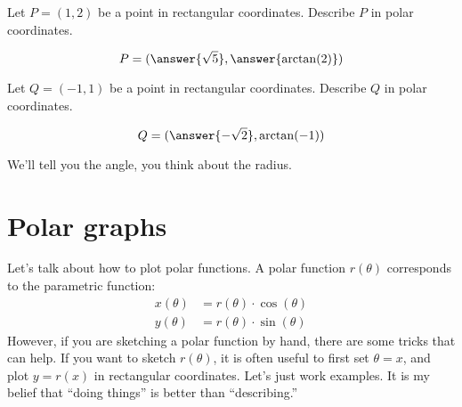 \documentclass{ximera}
\begin{document}
\begin{question}
  Let $P=(1,2)$ be a point in rectangular coordinates. Describe $P$ in
  polar coordinates.
  \begin{prompt}
    \[
    P = (\answer{\sqrt{5}}, \answer{\arctan(2)})
    \]
  \end{prompt}
  \begin{question}
  Let $Q=(-1,1)$ be a point in rectangular coordinates. Describe $Q$ in
  polar coordinates.
  \begin{prompt}
    \[
    Q = (\answer{-\sqrt{2}}, \arctan(-1))
    \]
    \begin{hint}
      We'll tell you the angle, you think about the radius.
    \end{hint}
  \end{prompt}
\end{question}
\end{question}

\section{Polar graphs}

Let's talk about how to plot polar functions. A polar function
$r(\theta)$ corresponds to the parametric function:
\begin{align*} 
  x(\theta) &= r(\theta) \cdot \cos(\theta)\\
  y(\theta) &= r(\theta) \cdot \sin(\theta)
\end{align*}
However, if you are sketching a polar function by hand, there are some
tricks that can help. If you want to sketch $r(\theta)$, it is often
useful to first set $\theta = x$, and plot $y=r(x)$ in rectangular
coordinates. Let's just work examples. It is my belief that ``doing
things'' is better than ``describing.''
\end{document}
